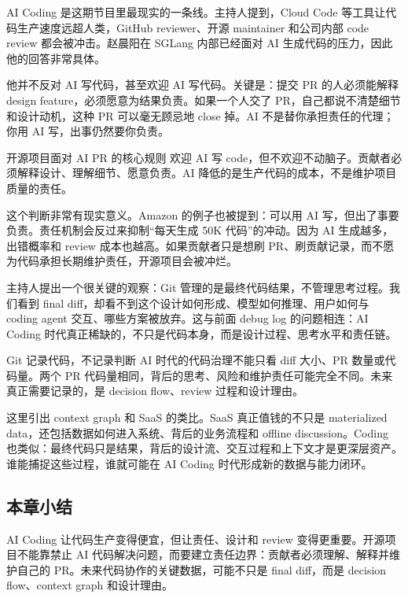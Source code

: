 \documentclass[a4paper]{article}
\begin{document}
AI Coding 是这期节目里最现实的一条线。主持人提到，Cloud Code 等工具让代码生产速度远超人类，GitHub reviewer、开源 maintainer 和公司内部 code review 都会被冲击。赵晨阳在 SGLang 内部已经面对 AI 生成代码的压力，因此他的回答非常具体。

他并不反对 AI 写代码，甚至欢迎 AI 写代码。关键是：提交 PR 的人必须能解释 design feature，必须愿意为结果负责。如果一个人交了 PR，自己都说不清楚细节和设计动机，这种 PR 可以毫无顾忌地 close 掉。AI 不是替你承担责任的代理；你用 AI 写，出事仍然要你负责。

\begin{importantbox}{开源项目面对 AI PR 的核心规则}
欢迎 AI 写 code，但不欢迎不动脑子。贡献者必须解释设计、理解细节、愿意负责。AI 降低的是生产代码的成本，不是维护项目质量的责任。
\end{importantbox}

这个判断非常有现实意义。Amazon 的例子也被提到：可以用 AI 写，但出了事要负责。责任机制会反过来抑制“每天生成 50K 代码”的冲动。因为 AI 生成越多，出错概率和 review 成本也越高。如果贡献者只是想刷 PR、刷贡献记录，而不愿为代码承担长期维护责任，开源项目会被冲烂。

主持人提出一个很关键的观察：Git 管理的是最终代码结果，不管理思考过程。我们看到 final diff，却看不到这个设计如何形成、模型如何推理、用户如何与 coding agent 交互、哪些方案被放弃。这与前面 debug log 的问题相连：AI Coding 时代真正稀缺的，不只是代码本身，而是设计过程、思考水平和责任链。

\begin{warningbox}{Git 记录代码，不记录判断}
AI 时代的代码治理不能只看 diff 大小、PR 数量或代码量。两个 PR 代码量相同，背后的思考、风险和维护责任可能完全不同。未来真正需要记录的，是 decision flow、review 过程和设计理由。
\end{warningbox}

这里引出 context graph 和 SaaS 的类比。SaaS 真正值钱的不只是 materialized data，还包括数据如何进入系统、背后的业务流程和 offline discussion。Coding 也类似：最终代码只是结果，背后的设计流、交互过程和上下文才是更深层资产。谁能捕捉这些过程，谁就可能在 AI Coding 时代形成新的数据与能力闭环。

\subsection{本章小结}

AI Coding 让代码生产变得便宜，但让责任、设计和 review 变得更重要。开源项目不能靠禁止 AI 代码解决问题，而要建立责任边界：贡献者必须理解、解释并维护自己的 PR。未来代码协作的关键数据，可能不只是 final diff，而是 decision flow、context graph 和设计理由。
\end{document}
